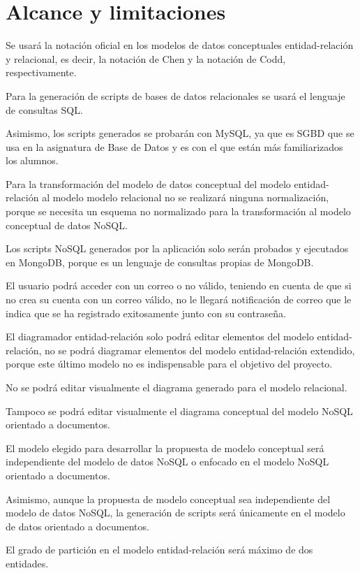 \section{Alcance y limitaciones}

Se usará la notación oficial en los modelos de datos conceptuales entidad-relación y relacional, es decir, la notación de Chen y la notación de Codd, respectivamente.


Para la generación de scripts de bases de datos relacionales se usará el lenguaje de consultas SQL.


Asimismo, los scripts generados se probarán con MySQL, ya que es SGBD que se usa en la asignatura de Base de Datos y es con el que están más familiarizados los alumnos.



Para la transformación del modelo de datos conceptual del modelo entidad-relación al modelo modelo relacional no se realizará ninguna normalización, porque se necesita un esquema no normalizado para la transformación al modelo conceptual de datos NoSQL.


Los scripts NoSQL generados por la aplicación solo serán probados y ejecutados en MongoDB, porque es un lenguaje de consultas propias de MongoDB.


El usuario podrá acceder con un correo o no válido, teniendo en cuenta de que si no crea su cuenta con un correo válido, no le llegará notificación de correo que le indica que se ha registrado exitosamente junto con su contraseña.


El diagramador entidad-relación solo podrá editar elementos del modelo entidad-relación, no se podrá diagramar elementos del modelo entidad-relación extendido, porque este último modelo no es indispensable para el objetivo del proyecto.


No se podrá editar visualmente el diagrama generado para el modelo relacional.


Tampoco se podrá editar visualmente el diagrama conceptual del modelo NoSQL orientado a documentos.


El modelo elegido para desarrollar la propuesta de modelo conceptual será independiente del modelo de datos NoSQL o enfocado en el modelo NoSQL orientado a documentos.


Asimismo, aunque la propuesta de modelo conceptual sea independiente del modelo de datos NoSQL, la generación de scripts será únicamente en el modelo de datos orientado a documentos.


El grado de partición en el modelo entidad-relación será máximo de dos entidades.


